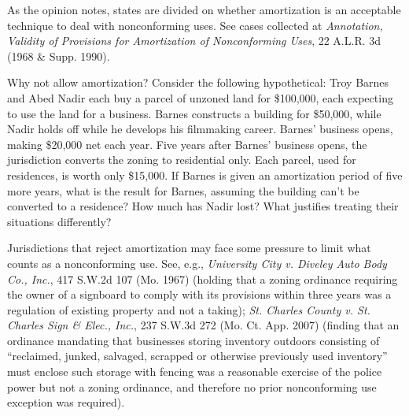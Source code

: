 \item
As the opinion notes, states are divided on whether amortization is an
acceptable technique to deal with nonconforming uses. See cases collected at
\emph{Annotation, Validity of Provisions for Amortization of Nonconforming
Uses}, 22 A.L.R. 3d (1968 \& Supp. 1990). 

Why not allow amortization? Consider the following hypothetical: Troy Barnes and
Abed Nadir each buy a parcel of unzoned land for \$100,000, each expecting to
use the land for a business. Barnes constructs a building for \$50,000, while
Nadir holds off while he develops his filmmaking career. Barnes' business opens,
making \$20,000 net each year. Five years after Barnes' business opens, the
jurisdiction converts the zoning to residential only. Each parcel, used for
residences, is worth only \$15,000. If Barnes is given an amortization period of
five more years, what is the result for Barnes, assuming the building can't be
converted to a residence? How much has Nadir lost? What justifies treating their
situations differently?

\item
Jurisdictions that reject amortization may face some pressure to limit what
counts as a nonconforming use. See, e.g., \emph{University City v. Diveley Auto
Body Co., Inc.}, 417 S.W.2d 107 (Mo. 1967) (holding that a zoning ordinance
requiring the owner of a signboard to comply with its provisions within three
years was a regulation of existing property and not a taking); \emph{St. Charles
County v. St. Charles Sign \& Elec., Inc.}, 237 S.W.3d 272 (Mo. Ct. App. 2007)
(finding that an ordinance mandating that businesses storing inventory outdoors
consisting of ``reclaimed, junked, salvaged, scrapped or otherwise previously
used inventory'' must enclose such storage with fencing was a reasonable
exercise of the police power but not a zoning ordinance, and therefore no prior
nonconforming use exception was required).

